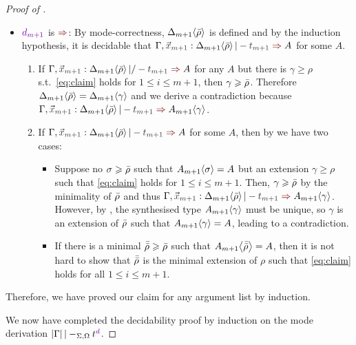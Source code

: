 \begin{proof}[Proof of {}]
\begin{itemize}
\begin{claimproof}
\begin{enumerate}
\begin{enumerate}
\begin{itemize}
                  \item $\dir{d_{m+1}}$ is $\syn$: By mode-correctness, ${\Delta_{m+1}}\!\left<{\bar{\rho}}\right>$ is defined and by the induction hypothesis, it is decidable that $\Gamma, \vars{x}_\isTerm{m+1} : \simsub{\Delta_{m+1}}{\ext{\rho}} |- \isTerm{t_{m+1}} \syn A$ for some $A$.
                    \begin{enumerate}
                      \item If $\Gamma, \vars{x}_\isTerm{m+1} : \simsub{\Delta_{m+1}}{\ext{\rho}} |/- \isTerm{t_{m+1}} \syn A$ for any $A$ but there is $\gamma \geq \rho$ s.t.\ \eqref{eq:claim} holds for $1 \leq i \leq m+1$, then $\gamma \geqslant \bar{\rho}$.
                        Therefore ${\Delta_{m+1}}\!\left<{\bar{\rho}}\right> = {\Delta_{m+1}}\!\left<{\gamma}\right>$ and we derive a contradiction because $\Gamma, \vars{x}_\isTerm{m+1} : \simsub{\Delta_{m+1}}{\ext{\rho}} |- \isTerm{t_{m+1}} \syn \simsub{A_{m+1}}{\gamma}$.
                      \item If $\Gamma, \vars{x}_\isTerm{m+1} : \simsub{\Delta_{m+1}}{\ext{\rho}} |- \isTerm{t_{m+1}} \syn A$ for some $A$, then by  we have two cases: %
                        \begin{itemize}
                          \item Suppose no $\sigma \geqslant \bar{\rho}$ such that ${A_{m+1}}\!\left<{\sigma}\right> = A$ but an extension $\gamma \geq \rho$ such that \eqref{eq:claim} holds for $1 \leq i \leq m + 1$. 
                            Then, $\gamma \geqslant \bar{\rho}$ by the minimality of $\bar{\rho}$ and thus
                            $\Gamma, \vars{x}_\isTerm{m+1} : \simsub{\Delta_{m+1}}{\ext{\rho}} |- \isTerm{t_{m+1}} \syn \simsub{A_{m+1}}{\gamma}$.
                            However, by , the synthesised type ${A_{m+1}}\!\left<{\gamma}\right>$ must be unique, so $\gamma$ is an extension of $\bar{\rho}$ such that ${A_{m+1}}\!\left<{\gamma}\right> = A$, leading to a contradiction.
                          \item If there is a minimal $\bar{\bar{\rho}} \geqslant \bar{\rho}$ such that ${A_{m+1}}\!\left<{\bar{\bar{\rho}}}\right> = A$, then it is not hard to show that $\bar{\bar{\rho}}$ is the minimal extension of $\rho$ such that \eqref{eq:claim} holds for all $1 \leq i \leq m + 1$.
                        \end{itemize}
                    \end{enumerate}
                \end{itemize}
            \end{enumerate}
        \end{enumerate}
        Therefore, we have proved our claim for any argument list by induction.
      \end{claimproof}
  \end{itemize}
  We now have completed the decidability proof by induction on the mode derivation $\erase{\Gamma} |-_{\Sigma, \Omega} t^{\dir{d}}$.
\end{proof}

